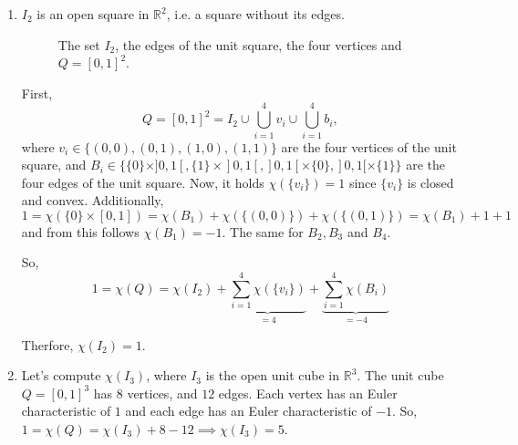 \documentclass[fontsize=11pt, paper=a4]{scrartcl}
\begin{document}
\begin{enumerate}
    \item $I_2$ is an open square in $\mathbb R^2$, i.e. a square without its edges.
    \begin{figure}[htbp]
        \centering
        \caption{The set $I_2$, the edges of the unit square, the four vertices and $Q=[0,1]^2$.}
    \end{figure}

    First, 
    $$
        Q = [0,1]^2 = I_2 \cup \bigcup_{i=1}^4 v_i \cup \bigcup^4_{i=1} b_i,
    $$ 
    where $v_i \in \{ (0,0),(0,1),(1,0),(1,1) \}$ are the four vertices of the unit square, and $B_i \in \{\{0\} \times ]0,1[, \{1\} \times ]0,1[, ]0,1[ \times \{0\}, ]0,1[ \times \{1\} \}$ are the four edges of the unit square. Now, it holds $\chi(\{v_i\}) = 1$ since $\{v_i\}$ is closed and convex. Additionally, 
    $$
        1 = \chi(\{0\} \times [0,1]) = \chi(B_1) + \chi(\{(0,0)\}) + \chi(\{(0,1)\}) = \chi(B_1) + 1 + 1
    $$ 
    and from this follows $\chi(B_1) = -1$. The same for $B_2, B_3$ and $B_4$.

    So, 
    $$
        1 = \chi(Q) = \chi(I_2) + \underbrace{\sum^4_{i=1}\chi(\{v_i\})}_{=4} + \underbrace{\sum^4_{i=1}\chi(B_i)}_{=-4} 
    $$

    Therfore, $\chi(I_2) = 1$.

    \item Let's compute $\chi(I_3)$, where $I_3$ is the open unit cube in $\mathbb R^3$. The unit cube $Q = [0,1]^3$ has $8$ vertices, and $12$ edges. Each vertex has an Euler characteristic of $1$ and each edge has an Euler characteristic of $-1$. So, $1=\chi(Q) = \chi(I_3) + 8 - 12 \implies \chi(I_3) = 5$.
\end{enumerate}
\end{document}
